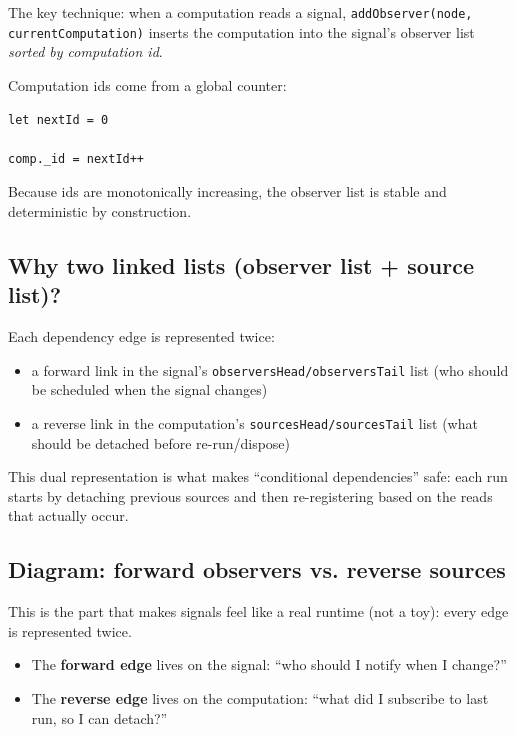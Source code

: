 The key technique: when a computation reads a signal, \texttt{addObserver(node, currentComputation)} inserts the computation into the signal's observer list \emph{sorted by computation id}.

Computation ids come from a global counter:

\begin{verbatim}
let nextId = 0

comp._id = nextId++
\end{verbatim}

Because ids are monotonically increasing, the observer list is stable and deterministic by construction.

\subsection{Why two linked lists (observer list + source list)?}

Each dependency edge is represented twice:

\begin{itemize}
  \item a forward link in the signal’s \texttt{observersHead/observersTail} list (who should be scheduled when the signal changes)
  \item a reverse link in the computation’s \texttt{sourcesHead/sourcesTail} list (what should be detached before re-run/dispose)
\end{itemize}

This dual representation is what makes ``conditional dependencies'' safe: each run starts by detaching previous sources and then re-registering based on the reads that actually occur.

\subsection{Diagram: forward observers vs. reverse sources}

This is the part that makes signals feel like a real runtime (not a toy): every edge is represented twice.

\begin{itemize}
  \item The \textbf{forward edge} lives on the signal: ``who should I notify when I change?''
  \item The \textbf{reverse edge} lives on the computation: ``what did I subscribe to last run, so I can detach?''
\end{itemize}

